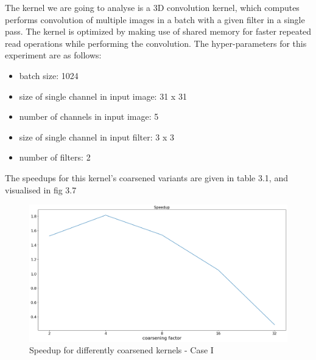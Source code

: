 The kernel we are going to analyse is a 3D convolution kernel, which computes performs convolution of multiple images in a batch with a given filter in a single pass. The kernel is optimized by making use of shared memory for faster repeated read operations while performing the convolution. The hyper-parameters for this experiment are as follows:

\begin{itemize}
\item batch size: 1024
\item size of single channel in input image: 31 x 31
\item number of channels in input image: 5
\item size of single channel in input filter: 3 x 3
\item number of filters: 2
\end{itemize}

The speedups for this kernel's coarsened variants are given in table 3.1, and visualised in fig 3.7

    

\begin{figure}[ht]
	\centering
	\includegraphics[scale=0.30]{Pictures/plots/good_improvement_coarsening/speedup.png}
	\caption{\small Speedup for differently coarsened kernels - Case I}
\end{figure}

